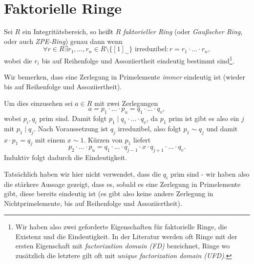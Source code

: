 
\section{Faktorielle Ringe}

\begin{definition}
    Sei $R$ ein Integritätsbereich, so heißt $R$ \emph{faktorieller Ring} (oder \emph{Gaußscher Ring}, oder auch \emph{ZPE-Ring}) genau dann wenn
    $$ \forall r \in R \exists r_1, \hdots, r_n \in R \setminus \{ [1]_\sim \} \text{ irreduzibel} : r = r_1 \cdot \hdots \cdot r_n, $$
    wobei die $r_i$ bis auf Reihenfolge und Assoziiertheit eindeutig bestimmt sind\footnote{Wir haben also zwei geforderte Eigenschaften für faktorielle Ringe, die Existenz und die Eindeutigkeit. In der Literatur werden oft Ringe mit der ersten Eigenschaft mit \emph{factorization domain (FD)} bezeichnet, Ringe wo zusätzlich die letztere gilt oft mit \emph{unique factorization domain (UFD)}.}.
\end{definition}

\begin{remark}
    Wir bemerken, dass eine Zerlegung in Primelemente \emph{immer} eindeutig ist (wieder bis auf Reihenfolge und Assoziiertheit).

    Um dies einzusehen sei $a \in R$ mit zwei Zerlegungen
    $$ a = p_1 \cdot \hdots \cdot p_u = q_1 \cdot \hdots \cdot q_v, $$
    wobei $p_i, q_i$ prim sind. Damit folgt $p_1 \mid q_1 \cdot \hdots \cdot q_v$, da $p_1$ prim ist gibt es also ein $j$ mit $p_1 \mid q_j$. Nach Voraussetzung ist $q_j$ irreduzibel, also folgt $p_1 \sim q_j$ und damit $x \cdot p_1 = q_j$ mit einem $x \sim 1$. Kürzen von $p_1$ liefert
    $$ p_2 \cdot \hdots \cdot p_u = q_1 \cdot \hdots \cdot q_{j-1} \cdot x \cdot q_{j+1} \cdot \hdots \cdot q_v. $$
    Induktiv folgt dadurch die Eindeutigkeit.

    Tatsächlich haben wir hier nicht verwendet, dass die $q_i$ prim sind - wir haben also die stärkere Aussage gezeigt, dass es, sobald es eine Zerlegung in Primelemente gibt, diese bereits eindeutig ist (es gibt also keine andere Zerlegung in Nichtprimelemente, bis auf Reihenfolge und Assoziiertheit).
\end{remark}

